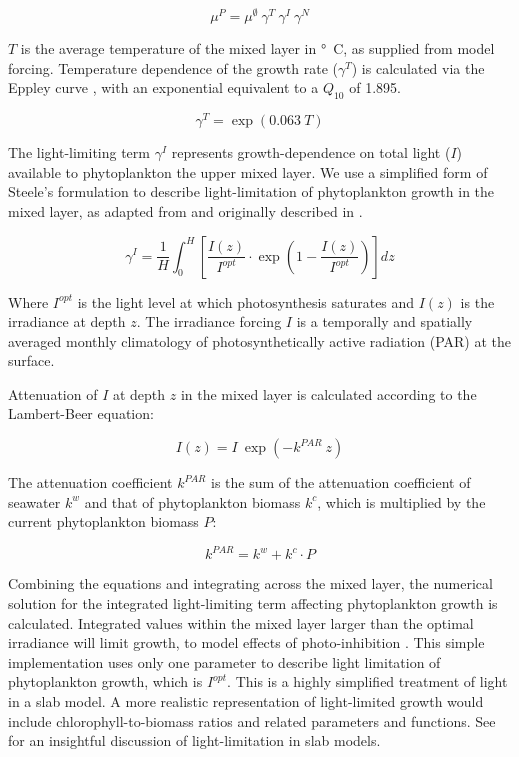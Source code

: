 \documentclass[journal abbreviations, manuscript]{copernicus}
\begin{document}
\begin{equation}
    \mu^{P} = \mu^{\emptyset} \ \gamma^{T} \ \gamma^{I} \ \gamma^{N}
\end{equation}

$T$ is the average temperature of the mixed layer in \unit{\degree C}, as supplied from model forcing. Temperature dependence of the growth rate ($\gamma^{T}$) is calculated via the Eppley curve \citep{Eppley1972TemperatureSea}, with an exponential equivalent to a $Q_{10}$ of 1.895.

\begin{equation}
    \gamma^{T} = \exp{(0.063 \ T)} \label{mumax}
\end{equation}

The light-limiting term $\gamma^{I}$ represents growth-dependence on total light ($I$) available to phytoplankton the upper mixed layer. We use a simplified form of Steele's formulation to describe light-limitation of phytoplankton growth in the mixed layer, as adapted from \citet{Acevedo-Trejos2016} and originally described in \citet{Steele1962EnvironmentalSea}.

\begin{equation}
    \gamma^{I} = \frac{1}{H} \int_{0}^{H}\left[ \frac{I(z)}{I^{opt}} \cdot \exp{\left( 1 - \frac{I(z)}{I^{opt}} \right) }  \right]dz \label{steele1}
\end{equation}

Where $I^{opt}$ is the light level at which photosynthesis saturates and $I(z)$ is the irradiance at depth $z$.
The irradiance forcing $I$ is a temporally and spatially averaged monthly climatology of photosynthetically active radiation (PAR) at the surface. 

Attenuation of $I$ at depth $z$ in the mixed layer is calculated according to the Lambert-Beer equation:

\begin{equation}
    I(z) = I \ \exp{(-k^{PAR} \ z)} \label{beer}
\end{equation}

The attenuation coefficient $k^{PAR}$ is the sum of the attenuation coefficient of seawater $k^w$ and that of phytoplankton biomass $k^c$, which is multiplied by the current phytoplankton biomass $P$:

\begin{equation}
    k^{PAR} = k^w + k^c \cdot P
\end{equation}

Combining the equations and integrating across the mixed layer, the numerical solution for the integrated light-limiting term affecting phytoplankton growth is calculated. Integrated values within the mixed layer larger than the optimal irradiance will limit growth, to model effects of photo-inhibition \citep{Steele1962EnvironmentalSea}.
This simple implementation uses only one parameter to describe light limitation of phytoplankton growth, which is $I^{opt}$. This is a highly simplified treatment of light in a slab model. A more realistic representation of light-limited growth would include chlorophyll-to-biomass ratios and related parameters and functions. See \citet{Anderson2015c} for an insightful discussion of light-limitation in slab models.
\end{document}
